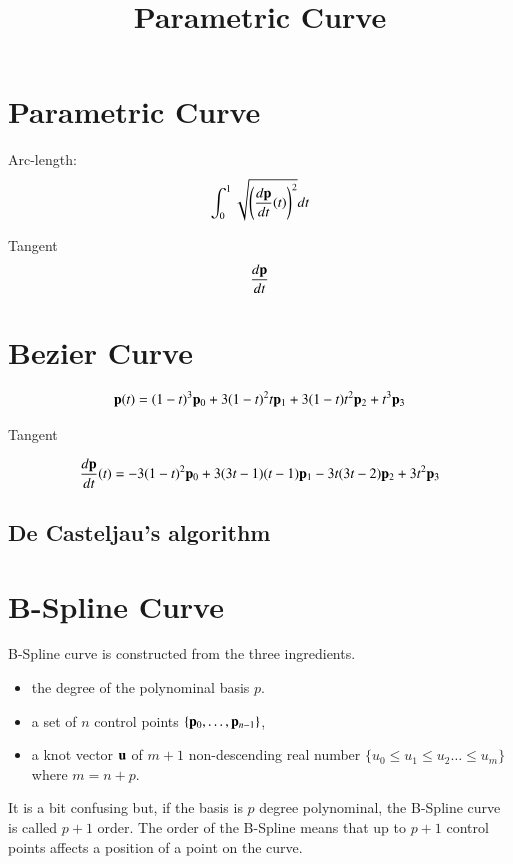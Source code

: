 

\title{Parametric Curve}



\maketitle
\tableofcontents


\section{Parametric Curve}


Arc-length:
\begin{eqnarray}
\int_0^1 \sqrt{ \left( \frac{d\mathbf{p}}{dt}(t) \right)^2 } dt \\
\end{eqnarray}

Tangent
\begin{equation}
\frac{d\mathbf{p}}{dt}
\end{equation}

\section{Bezier Curve}

\begin{equation}
\mathbf{p}(t) = (1-t)^3\mathbf{p}_0 + 3(1-t)^2t\mathbf{p}_1 + 3(1-t)t^2\mathbf{p}_2 + t^3\mathbf{p}_3
\end{equation}

Tangent

\begin{equation}
\frac{d\mathbf{p}}{dt}(t) = -3(1-t)^2\mathbf{p}_0 + 3(3t-1)(t-1)\mathbf{p}_1 - 3t(3t-2)\mathbf{p}_2 + 3t^2\mathbf{p}_3
\end{equation}




\subsection{De Casteljau's algorithm}




\section{B-Spline Curve}


B-Spline curve is constructed from the three ingredients. 
\begin{itemize}
\item the degree of the polynominal basis $p$.
\item a set of $n$ control points $\{\mathbf{p}_0,\ldots, \mathbf{p}_{n-1}\}$,
\item a knot vector $\mathbf{u}$ of $m+1$ non-descending real number $\{u_0\le u_1 \le  u_2\ldots \le u_{m}\}$ where $m=n+p$.
\end{itemize}
%
It is a bit confusing but, if the basis is $p$ degree polynominal, the B-Spline curve is called $p+1$ order.
%
The order of the B-Spline means that up to $p+1$ control points affects a position of a point on the curve.

